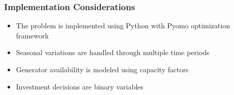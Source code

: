 \subsubsection{Implementation Considerations}
\begin{itemize}
    \item The problem is implemented using Python with Pyomo optimization framework
    \item Seasonal variations are handled through multiple time periods
    \item Generator availability is modeled using capacity factors
    \item Investment decisions are binary variables
\end{itemize} 